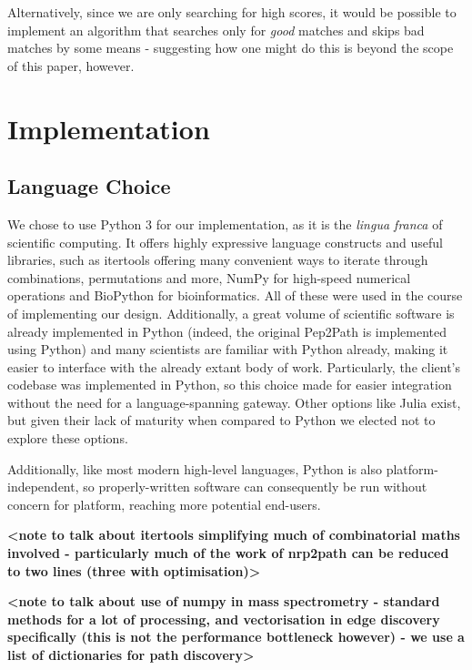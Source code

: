 \documentclass{l4proj}
\newcommand{\cit}[1]{\citep{#1}}
\begin{document}
Alternatively, since we are only searching for high scores, it would be possible to implement an algorithm that searches only for \textit{good} matches and skips bad matches by some means - suggesting how one might do this is beyond the scope of this paper, however. 

\chapter{Implementation}

\section{Language Choice}

We chose to use Python 3 for our implementation, as it is the \textit{lingua franca} of scientific computing. It offers highly expressive language constructs and useful libraries, such as itertools \cit{itools} offering many convenient ways to iterate through combinations, permutations and more, NumPy \cit{numpy} for high-speed numerical operations and BioPython \cit{biopy} for bioinformatics. All of these were used in the course of implementing our design. Additionally, a great volume of scientific software is already implemented in Python (indeed, the original Pep2Path is implemented using Python) and many scientists are familiar with Python already, making it easier to interface with the already extant body of work. Particularly, the client's codebase was implemented in Python, so this choice made for easier integration without the need for a language-spanning gateway. Other options like Julia \cit{julia} exist, but given their lack of maturity when compared to Python we elected not to explore these options. 

Additionally, like most modern high-level languages, Python is also platform-independent, so properly-written software can consequently be run without concern for platform, reaching more potential end-users.

\textbf{<note to talk about itertools simplifying much of combinatorial maths involved - particularly much of the work of nrp2path can be reduced to two lines (three with optimisation)>}

\textbf{<note to talk about use of numpy in mass spectrometry - standard methods for a lot of processing, and vectorisation in edge discovery specifically (this is not the performance bottleneck however) - we use a list of dictionaries for path discovery>}
\end{document}
